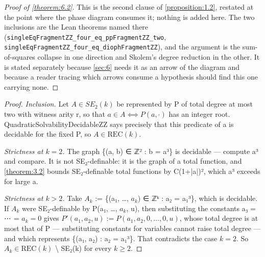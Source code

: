 \begin{proof}[Proof of \cref{theorem:6.2}]
This is the second clause of \cref{proposition:1.2}, restated at the point where the phase diagram consumes it; nothing is added here. The two inclusions are the Lean theorems named there (\texttt{singleEqFragmentZZ\_\allowbreak{}four\_\allowbreak{}eq\_\allowbreak{}ppFragmentZZ\_\allowbreak{}two}, \texttt{singleEqFragmentZZ\_\allowbreak{}four\_\allowbreak{}eq\_\allowbreak{}diophFragmentZZ}), and the argument is the sum-of-squares collapse in one direction and Skolem's degree reduction in the other. It is stated separately because \cref{sec:6} needs it as an arrow of the diagram and because a reader tracing which arrows consume a hypothesis should find this one carrying none.

\end{proof}
\begin{proof}
\emph{Inclusion.} Let $A ∈ SE_{2}(k)$ be represented by P of total degree at most two with witness arity r, so that $a ∈ A ⟺ P(a, ·)$ has an integer root. QuadraticSolvabilityDecidableZZ says precisely that this predicate of a is decidable for the fixed P, so $A ∈ \mathrm{REC}(k)$.

\emph{Strictness at $k = 2$.} The graph \{(a, b) ∈ ℤ² : b = a³\} is decidable — compute a³ and compare. It is not SE₂-definable: it is the graph of a total function, and \cref{theorem:3.2} bounds SE₂-definable total functions by C(1+|a|)², which a³ exceeds for large a.

\emph{Strictness at $k > 2$.} Take $A_{k}$ := \{(a₁, …, $a_{k}$) ∈ ℤᵏ : a₂ = a₁³\}, which is decidable. If $A_{k}$ were SE₂-definable by P(a₁, …, $a_{k}$, u), then substituting the constants a₃ = ⋯ = $a_{k} = 0$ gives $P′(a_{1}, a_{2}, u) := P(a_{1}, a_{2}, 0, …, 0, u)$, whose total degree is at most that of P — substituting constants for variables cannot raise total degree — and which represents \{(a₁, a₂) : a₂ = a₁³\}. That contradicts the case $k = 2$. So $A_{k} ∈ \mathrm{REC}(k)$ \textbackslash{} SE₂(k) for every $k ≥ 2$.

\end{proof}
